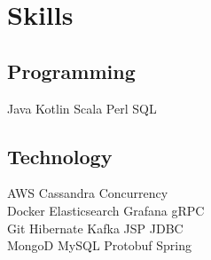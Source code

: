 \section{Skills}
\subsection{Programming}
Java \textbullet{} Kotlin \textbullet{} Scala \textbullet{} Perl \textbullet{} SQL
\sectionsep

\subsection{Technology}
AWS \textbullet{} Cassandra \textbullet{} Concurrency \\
Docker \textbullet{} Elasticsearch \textbullet{} Grafana \textbullet{} gRPC \\
Git \textbullet{} Hibernate \textbullet{} Kafka \textbullet{} JSP \textbullet{} JDBC\\
MongoD \textbullet{} MySQL \textbullet{} Protobuf \textbullet{} Spring \sectionsep
